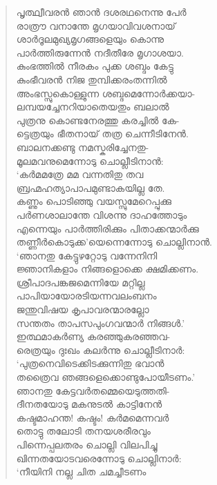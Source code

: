 \begin{verse}
പൃത്ഥ്വീവരന്‍ ഞാന്‍ ദശരഥനെന്നു പേര്‍\\
രാത്രൗ വനാന്തേ മൃഗയാവിവശനായ്\\
ശാര്‍ദൂലമുഖ്യമൃഗങ്ങളെയും കൊന്നു\\
പാര്‍ത്തിരുന്നേന്‍ നദീതീരേ മൃഗാശയാ.\\
കുംഭത്തില്‍ നീരകം പുക്ക ശബ്ദം കേട്ടു\\
കുംഭീവരന്‍ നിജ തുമ്പിക്കരംതന്നില്‍\\
അംഭസ്സുകൊള്ളുന്ന ശബ്ദമെന്നോര്‍ക്കയാ-\\
ലമ്പയച്ചേനറിയാതെയതും ബലാല്‍\\
പുത്രനു കൊണ്ടനേരത്തു കരച്ചില്‍ കേ-\\
ട്ടെത്രയും ഭീതനായ് തത്ര ചെന്നീടിനേന്‍.\\
ബാലനക്കണ്ടു നമസ്കരിച്ചേനതു-\\
മൂലമവനുമെന്നോടു ചൊല്ലീടിനാന്‍:\\
‘കര്‍മമത്രേ മമ വന്നതിതു തവ\\
ബ്രഹ്മഹത്യാപാപമുണ്ടാകയില്ല തേ.\\
കണ്ണും പൊടിഞ്ഞു വയസ്സുമേറെപ്പുക്കു\\
പര്‍ണശാലാന്തേ വിശന്നു ദാഹത്തോടും\\
എന്നെയും പാര്‍ത്തിരിക്കും പിതാക്കന്മാര്‍ക്കു\\
തണ്ണീര്‍കൊടുക്ക’യെന്നെന്നോടു ചൊല്ലിനാന്‍.\\
‘ഞാനതു കേട്ടുഴറ്റോടു വന്നേനിനി\\
ജ്ഞാനികളാം നിങ്ങളൊക്കെ ക്ഷമിക്കണം.\\
ശ്രീപാദപങ്കജമെന്നിയേ മറ്റില്ല\\
പാപിയായോരടിയന്നവലംബനം\\
ജന്തുവിഷയ കൃപാവരന്മാരല്ലോ\\
സന്തതം താപസപുംഗവന്മാര്‍ നിങ്ങള്‍.’\\
ഇത്ഥമാകര്‍ണ്യ കരഞ്ഞുകരഞ്ഞവ-\\
രെത്രയും ദുഃഖം കലര്‍ന്നു ചൊല്ലീടിനാര്‍:\\
‘പുത്രനെവിടെക്കിടക്കുന്നിതു ഭവാന്‍\\
തത്രൈവ ഞങ്ങളെക്കൊണ്ടുപോയീടണം.’\\
ഞാനതു കേട്ടവര്‍തമ്മെയെടുത്തതി-\\
ദീനതയോടു മകനുടല്‍ കാട്ടിനേന്‍\\
കഷ്ടമാഹന്ത! കഷ്ടം! കര്‍മമെന്നവര്‍\\
തൊട്ടു തലോടി തനയശരീരവും\\
പിന്നെപ്പലതരം ചൊല്ലി വിലപിച്ചു\\
ഖിന്നതയോടവരെന്നോടു ചൊല്ലിനാര്‍:\\
‘നീയിനി നല്ല ചിത ചമച്ചീടണം\\

\end{verse}

